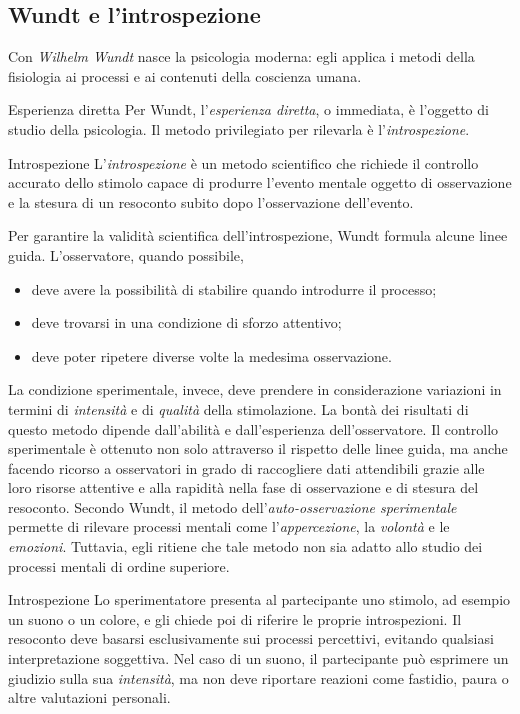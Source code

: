 \documentclass[a4paper]{article}
\begin{document}
\subsection{Wundt e l'introspezione}
Con \emph{Wilhelm Wundt} nasce la psicologia moderna: egli applica i metodi della fisiologia ai processi e ai contenuti della coscienza umana.
\begin{snippetdefinition}{Esperienza diretta}
    Per Wundt, l'\emph{esperienza diretta}, o immediata, è l'oggetto di studio della psicologia. Il metodo privilegiato per rilevarla è l'\emph{introspezione}.
\end{snippetdefinition}
\begin{snippetdefinition}{Introspezione}
    L'\emph{introspezione} è un metodo scientifico che richiede il controllo accurato dello stimolo capace di produrre l'evento mentale oggetto di osservazione e la stesura di un resoconto subito dopo l'osservazione dell'evento.
\end{snippetdefinition}
Per garantire la validità scientifica dell'introspezione, Wundt formula alcune linee guida. L'osservatore, quando possibile,
\begin{itemize}
    \item deve avere la possibilità di stabilire quando introdurre il processo;
    \item deve trovarsi in una condizione di sforzo attentivo;
    \item deve poter ripetere diverse volte la medesima osservazione.
\end{itemize}
La condizione sperimentale, invece, deve prendere in considerazione variazioni in termini di \emph{intensità} e di \emph{qualità} della stimolazione.
La bontà dei risultati di questo metodo dipende dall'abilità e dall'esperienza dell'osservatore. Il controllo sperimentale è ottenuto non solo attraverso il rispetto delle linee guida, ma anche facendo ricorso a osservatori in grado di raccogliere dati attendibili grazie alle loro risorse attentive e alla rapidità nella fase di osservazione e di stesura del resoconto.
Secondo Wundt, il metodo dell'\emph{auto-osservazione sperimentale} permette di rilevare processi mentali come l'\emph{appercezione}, la \emph{volontà} e le \emph{emozioni}. Tuttavia, egli ritiene che tale metodo non sia adatto allo studio dei processi mentali di ordine superiore.
\begin{snippetexample}{Introspezione}
    Lo sperimentatore presenta al partecipante uno stimolo, ad esempio un suono o un colore, e gli chiede poi di riferire le proprie introspezioni. Il resoconto deve basarsi esclusivamente sui processi percettivi, evitando qualsiasi interpretazione soggettiva. Nel caso di un suono, il partecipante può esprimere un giudizio sulla sua \emph{intensità}, ma non deve riportare reazioni come fastidio, paura o altre valutazioni personali.
\end{snippetexample}
\end{document}
